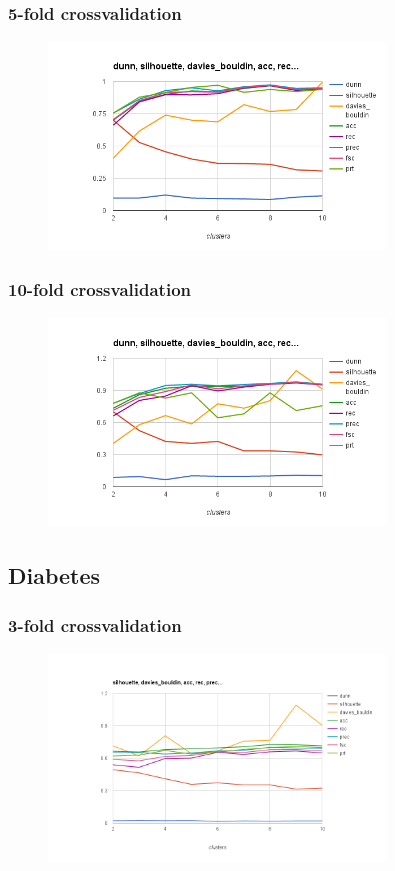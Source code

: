 \documentclass{article}
\begin{document}
\subsubsection{5-fold crossvalidation}
\begin{figure}[p]
    \centering
    \includegraphics[width=0.8\textwidth]{kmeans_iris.arff_5}
\end{figure}
\subsubsection{10-fold crossvalidation}
\begin{figure}[p]
    \centering
    \includegraphics[width=0.8\textwidth]{kmeans_iris.arff_10}
\end{figure}
\subsection{Diabetes}
\subsubsection{3-fold crossvalidation}
\begin{figure}[p]
    \centering
    \includegraphics[width=0.8\textwidth]{kmeans_diabetes.arff_3}
\end{figure}
\end{document}
